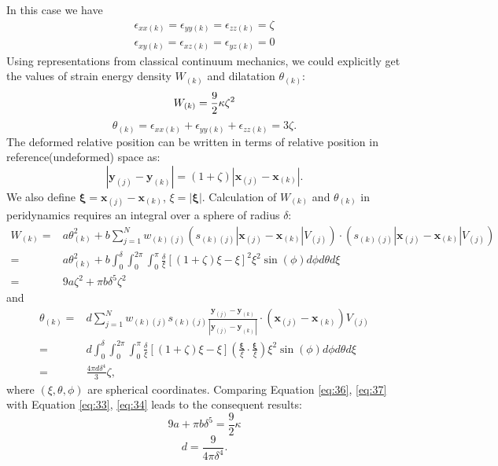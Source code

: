 \documentclass[11pt,fullpage]{article}
\newcommand{\mb}[1]{\mathbf{#1}}
\newcommand{\blue}[1]{#1}
\begin{document}
In this case we have
\begin{eqnarray}
  \epsilon_{xx(k)} =  \epsilon_{yy(k)} = \epsilon_{zz(k)} = \zeta\\
  \epsilon_{xy(k)} =  \epsilon_{xz(k)} = \epsilon_{yz(k)} = 0
\end{eqnarray}
Using representations from classical continuum mechanics, we could explicitly get the values of strain energy density $W_{(k)}$ and dilatation $\theta_{(k)}$:
\begin{equation}
W_{(k)} = \frac{9}{2}\kappa\zeta^2\\
\label{eq:33}
\end{equation}
\begin{equation}
\theta_{(k)} = \epsilon_{xx(k)}+\epsilon_{yy(k)}+\epsilon_{zz(k)} = 3\zeta.
\label{eq:34}
\end{equation}
The deformed relative position can be written in terms of relative position in reference(undeformed) space as:
\begin{equation}
|\mb{y}_{(j)} - \mb{y}_{(k)}| = (1+\zeta)|\mb{x}_{(j)} - \mb{x}_{(k)}|.
\label{eq:35}
\end{equation}
We also define $\bm{\xi} = \mb{x}_{(j)} - \mb{x}_{(k)}$, $\xi = |\bm{\xi}|$.
Calculation of $W_{(k)}$ and $\theta_{(k)}$ in peridynamics requires an integral over a sphere of radius $\delta$:
\begin{equation}
\begin{aligned}
W_{(k)} =& a\theta_{(k)}^2
           +b\sum_{j=1}^{N}w_{(k)(j)}(s_{(k)(j)}|\mb{x}_{(j)}-\mb{x}_{(k)}|V_{(j)})\cdot(s_{(k)(j)}|\mb{x}_{(j)}-\mb{x}_{(k)}|V_{(j)})\\
        =& a\theta_{(k)}^2
           +b\int_0^\delta\int_0^{2\pi}\int_0^{\pi}\frac{\delta}{\xi}\left[(1+\zeta)\xi-\xi\right]^2\xi^2\sin(\phi)d\phi d\theta d\xi\\
        =& 9a\zeta^2+\pi b\delta^5\zeta^2
\end{aligned}
\label{eq:36}
\end{equation}
and
\begin{equation}
\begin{aligned}
\theta_{(k)} =& d\sum_{j=1}^{N}w_{(k)(j)}s_{(k)(j)}\frac{\mb{y}_{(j)} - \mb{y}_{(k)}}{|\mb{y}_{(j)} - \mb{y}_{(k)}|}\cdot(\mb{x}_{(j)}-\mb{x}_{(k)})V_{(j)}\\
        =& d\int_0^\delta\int_0^{2\pi}\int_0^{\pi}\frac{\delta}{\xi}\left[(1+\zeta)\xi-\xi\right](\frac{\bm{\xi}}{\xi}\cdot\frac{\bm{\xi}}{\xi})\xi^2\sin(\phi)d\phi d\theta d\xi\\
        =& \frac{4\pi d\delta^4}{3}\zeta,
\end{aligned}
\label{eq:37}
\end{equation}
where $(\xi,\theta,\phi)$ are spherical coordinates. Comparing Equation \blue{\ref{eq:36}}, \blue{\ref{eq:37}} with Equation \blue{\ref{eq:33}}, \blue{\ref{eq:34}} leads to the consequent results:
\begin{equation}
9a + \pi b\delta^5 = \frac{9}{2}\kappa
\label{eq:38}
\end{equation}
\begin{equation}
d = \frac{9}{4\pi\delta^4}.
\label{eq:39}
\end{equation}
\end{document}
